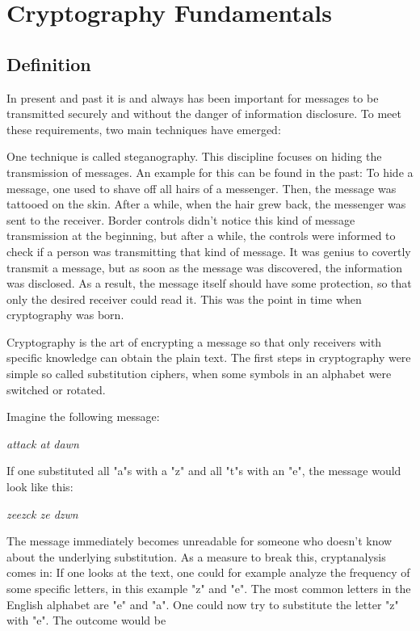 \chapter{Cryptography Fundamentals}

\section{Definition}

In present and past it is and always has been important for messages to be
transmitted securely and without the danger of information disclosure. To meet
these requirements, two main techniques have emerged:

One technique is called steganography. This discipline focuses on hiding the
transmission of messages. An example for this can be found in the past: To hide
a message, one used to shave off all hairs of a messenger. Then, the message
was tattooed on the skin. After a while, when the hair grew back, the messenger
was sent to the receiver. Border controls didn't notice this kind of message
transmission at the beginning, but after a while, the controls were informed to
check if a person was transmitting that kind of message. It was genius to
covertly transmit a message, but as soon as the message was discovered, the
information was disclosed. As a result, the message itself should have some
protection, so that only the desired receiver could read it. This was the point
in time when cryptography was born.

Cryptography is the art of encrypting a message so that only receivers with
specific knowledge can obtain the plain text. The first steps in cryptography
were simple so called substitution ciphers, when some symbols in an alphabet
were switched or rotated.

Imagine the following message:

\vspace{0.5cm}
\textit{attack at dawn}
\vspace{0.5cm}

If one substituted all "a"s with a "z" and all "t"s with an "e", the message
would look like this:

\vspace{0.5cm}
\textit{zeezck ze dzwn}
\vspace{0.5cm}

The message immediately becomes unreadable for someone who doesn't know about
the underlying substitution. As a measure to break this, cryptanalysis comes in:
If one looks
at the text, one could for example analyze the frequency of some specific
letters, in this example "z" and "e". The most common letters in the English
alphabet are "e" and "a". One could now try to substitute the letter "z" with
"e". The outcome would be

